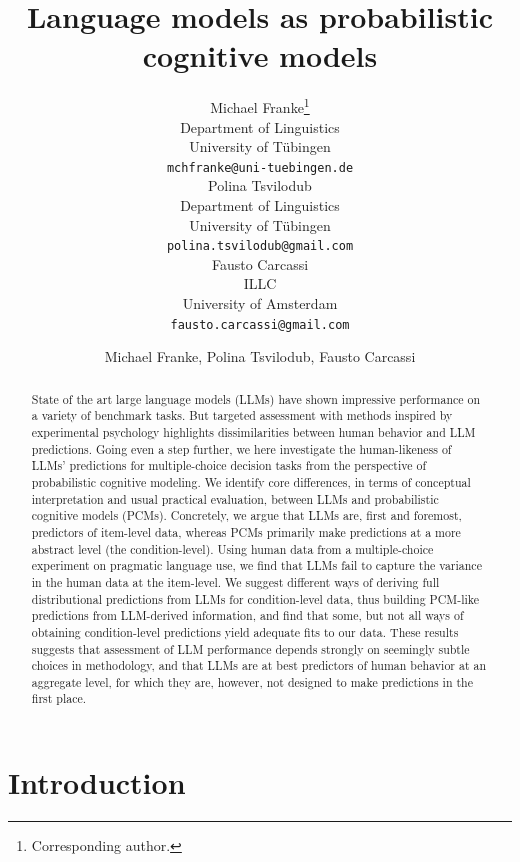 \documentclass[fleqn]{article}
\title{Language models as probabilistic cognitive models}
\date{}
\author{ Michael Franke\thanks{Corresponding author.} \\
	Department of Linguistics\\
	University of Tübingen\\
	\texttt{mchfranke@uni-tuebingen.de} \\
	\And
	Polina Tsvilodub \\
	Department of Linguistics\\
	University of Tübingen\\
	\texttt{polina.tsvilodub@gmail.com} \\
	\And
	Fausto Carcassi \\
	ILLC\\
	University of Amsterdam\\
	\texttt{fausto.carcassi@gmail.com} \\
}
\author{Michael Franke, Polina Tsvilodub, Fausto Carcassi}
\affil{Department of Linguistics\\University of Tübingen\\
\texttt{[michael.franke|polina.tsvilodub|fausto.carcassi]@uni-tuebingen.de}}
\begin{document}
\maketitle

\begin{abstract}
  State of the art large language models (LLMs) have shown impressive performance on a variety of benchmark tasks.
  But targeted assessment with methods inspired by experimental psychology highlights dissimilarities between human behavior and LLM predictions.
  Going even a step further, we here investigate the human-likeness of LLMs' predictions for multiple-choice decision tasks from the perspective of probabilistic cognitive modeling.
  We identify core differences, in terms of conceptual interpretation and usual practical evaluation, between LLMs and probabilistic cognitive models (PCMs).
  Concretely, we argue that LLMs are, first and foremost, predictors of item-level data, whereas PCMs primarily make predictions at a more abstract level (the condition-level).
  Using human data from a multiple-choice experiment on pragmatic language use, we find that LLMs fail to capture the variance in the human data at the item-level.
  We suggest different ways of deriving full distributional predictions from LLMs for condition-level data, thus building PCM-like predictions from LLM-derived information, and find that some, but not all ways of obtaining condition-level predictions yield adequate fits to our data.
  These results suggests that assessment of LLM performance depends strongly on seemingly subtle choices in methodology, and that LLMs are at best predictors of human behavior at an aggregate level, for which they are, however, not designed to make predictions in the first place.
\end{abstract}



\section{Introduction}
\label{sec:introduction}
\end{document}
